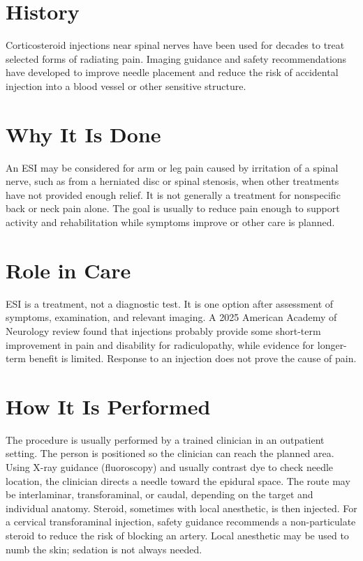 \section*{History}
Corticosteroid injections near spinal nerves have been used for decades to treat selected forms of radiating pain. Imaging guidance and safety recommendations have developed to improve needle placement and reduce the risk of accidental injection into a blood vessel or other sensitive structure.

\section*{Why It Is Done}
An ESI may be considered for arm or leg pain caused by irritation of a spinal nerve, such as from a herniated disc or spinal stenosis, when other treatments have not provided enough relief. It is not generally a treatment for nonspecific back or neck pain alone. The goal is usually to reduce pain enough to support activity and rehabilitation while symptoms improve or other care is planned.

\section*{Role in Care}
ESI is a treatment, not a diagnostic test. It is one option after assessment of symptoms, examination, and relevant imaging. A 2025 American Academy of Neurology review found that injections probably provide some short-term improvement in pain and disability for radiculopathy, while evidence for longer-term benefit is limited. Response to an injection does not prove the cause of pain.

\section*{How It Is Performed}
The procedure is usually performed by a trained clinician in an outpatient setting. The person is positioned so the clinician can reach the planned area. Using X-ray guidance (fluoroscopy) and usually contrast dye to check needle location, the clinician directs a needle toward the epidural space. The route may be interlaminar, transforaminal, or caudal, depending on the target and individual anatomy. Steroid, sometimes with local anesthetic, is then injected. For a cervical transforaminal injection, safety guidance recommends a non-particulate steroid to reduce the risk of blocking an artery. Local anesthetic may be used to numb the skin; sedation is not always needed.

